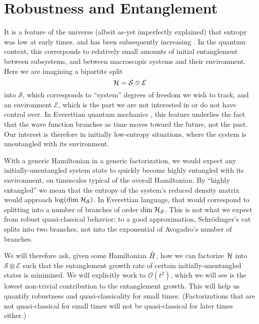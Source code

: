 \documentclass[aps,pra,onecolumn,nofootinbib,12pt,tightenlines]{revtex4-1}
\begin{document}
\section{Robustness and Entanglement}
\label{sec:robustness}

It is a feature of the universe (albeit as-yet imperfectly explained) that entropy was low at early times, and has been subsequently increasing \citep{penrose1979singularities,albert}.
In the quantum context, this corresponds to relatively small amounts of initial entanglement between subsystems, and between macroscopic systems and their environment.
Here we are imagining a bipartite split
\begin{equation}
\hs = \mathcal{S} \otimes \mathcal{E}
\end{equation}
into $\mathcal{S}$, which corresponds to ``system'' degrees of freedom we wish to track, and an environment $\mathcal{E}$, which is the part we are not interested in or do not have control over.
In Everettian quantum mechanics \cite{everett1957relative}, this feature underlies the fact that the wave function branches as time moves toward the future, not the past.
Our interest is therefore in initially low-entropy situations, where the system is unentangled with its environment.

With a generic Hamiltonian in a generic factorization, we would expect any initially-unentangled system state to quickly become highly entangled with its environment, on timescales typical of the overall Hamiltonian.
By ``highly entangled'' we mean that the entropy of the system's reduced density matrix would approach $\log(\mathrm{dim}\; \mathcal{H}_\mathcal{S})$.
In Everettian language, that would correspond to splitting into a number of branches of order $\mathrm{dim}\; \mathcal{H}_\mathcal{S}$.
This is not what we expect from robust quasi-classical behavior; to a good approximation, Schr\"odinger's cat splits into two branches, not into the exponential of Avogadro's number of branches.

We will therefore ask, given some Hamiltonian $\hat{H}$, how we can factorize $\mathcal{H}$ into $ \mathcal{S} \otimes \mathcal{E}$ such that the entanglement growth rate of certain initially-unentangled states is minimized.
We will explicitly work to $\mathcal{O}(t^2)$, which we will see is the lowest non-trivial contribution to the entanglement growth. This will help us quantify robustness and quasi-classicality for small times. (Factorizations that are not quasi-classical for small times will not be quasi-classical for later times either.)
 
\end{document}
